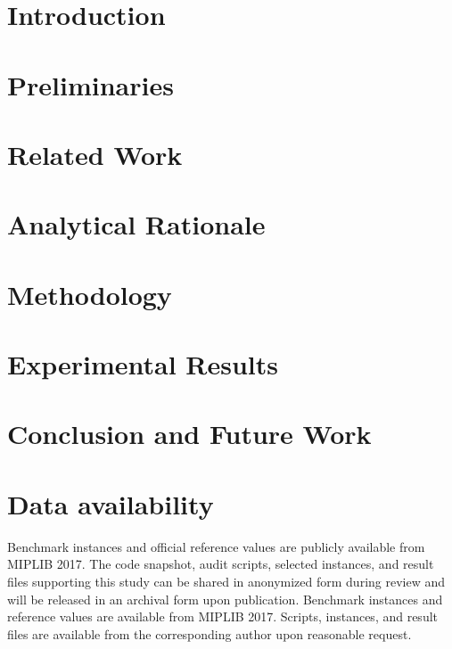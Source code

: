 \documentclass[preprint,12pt]{elsarticle}
\newif\ifanonymized
\begin{document}
\section{Introduction}
\label{sec:introduction}


\section{Preliminaries}
\label{sec:preliminaries}


\section{Related Work}
\label{sec:related_work}


\section{Analytical Rationale}
\label{sec:theory}


\section{Methodology}
\label{sec:methodology}


\section{Experimental Results}
\label{sec:experiments}


\section{Conclusion and Future Work}
\label{sec:conclusion}


\section*{Data availability}
\ifanonymized
Benchmark instances and official reference values are publicly available from MIPLIB 2017. The code snapshot, audit scripts, selected instances, and result files supporting this study can be shared in anonymized form during review and will be released in an archival form upon publication.
\else
Benchmark instances and reference values are available from MIPLIB 2017. Scripts, instances, and result files are available from the corresponding author upon reasonable request.
\end{document}
